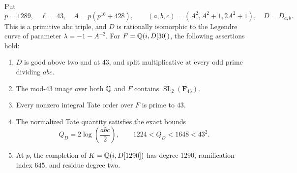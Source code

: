 \begin{theorem}
\label{thm:fr-balanced}
Put
\[
 p=1289,\quad\ell=43,\quad A=p(p^{16}+428),\qquad
 (a,b,c)=(A^2,A^2+1,2A^2+1),\quad D=D_{a,b}.
\]
This is a primitive abc triple, and $D$ is rationally isomorphic
to the Legendre curve of parameter $\lambda=-1-A^{-2}$.
For $F=\mathbb Q(i,D[30])$, the following assertions hold:
\begin{enumerate}
\item $D$ is good above two and at $43$, and split multiplicative
at every odd prime dividing $abc$.
\item The mod-$43$ image over both $\mathbb Q$ and $F$ contains
$\operatorname{SL}_2(\mathbf F_{43})$.
\item Every nonzero integral Tate order over $F$ is prime to $43$.
\item The normalized Tate quantity satisfies the exact bounds
\begin{equation}\label{eq:fr-balanced-height}
 Q_D=2\log\left(\frac{abc}{2}\right),
       \qquad 1224<Q_D<1648<43^2.
\end{equation}
\item At $p$, the completion of $K=\mathbb Q(i,D[1290])$ has degree
$1290$, ramification index $645$, and residue degree two.
\end{enumerate}
\end{theorem}
